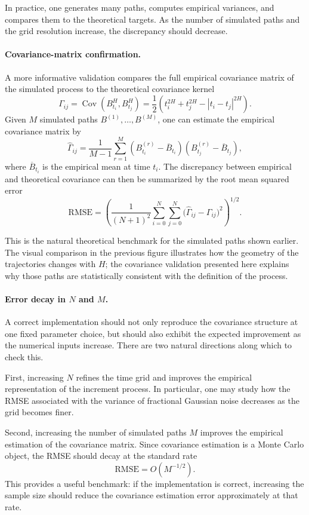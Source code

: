 \documentclass[a4paper,10pt,titlepage,oneside,openany]{book}
\theoremstyle{plain}
\theoremstyle{definition}
\theoremstyle{remark}
\newcommand{\Cov}{\operatorname{Cov}}
\newcommand{\1}{\mathbf{1}}
\begin{document}
In practice, one generates many paths, computes empirical variances, and compares them to the theoretical targets. As the number of simulated paths and the grid resolution increase, the discrepancy should decrease.

\paragraph{Covariance-matrix confirmation.} A more informative validation compares the full empirical covariance matrix of the simulated process to the theoretical covariance kernel
\[
\Gamma_{ij}
=
\Cov(B_{t_i}^H,B_{t_j}^H)
=
\frac12\left(
t_i^{2H}+t_j^{2H}-|t_i-t_j|^{2H}
\right).
\]
Given \(M\) simulated paths \(B^{(1)},\dots,B^{(M)}\), one can estimate the empirical covariance matrix by
\[
\widehat{\Gamma}_{ij}
=
\frac{1}{M-1}
\sum_{r=1}^{M}
\left(B_{t_i}^{(r)}-\overline{B}_{t_i}\right)
\left(B_{t_j}^{(r)}-\overline{B}_{t_j}\right),
\]
where \(\overline{B}_{t_i}\) is the empirical mean at time \(t_i\). The discrepancy between empirical and theoretical covariance can then be summarized by the root mean squared error
\[
\mathrm{RMSE}
=
\left(
\frac{1}{(N+1)^2}
\sum_{i=0}^{N}\sum_{j=0}^{N}
\bigl(\widehat{\Gamma}_{ij}-\Gamma_{ij}\bigr)^2
\right)^{1/2}.
\]

This is the natural theoretical benchmark for the simulated paths shown earlier. The visual comparison in the previous figure illustrates how the geometry of the trajectories changes with \(H\); the covariance validation presented here explains why those paths are statistically consistent with the definition of the process.

\paragraph{Error decay in \(N\) and \(M\).} A correct implementation should not only reproduce the covariance structure at one fixed parameter choice, but should also exhibit the expected improvement as the numerical inputs increase. There are two natural directions along which to check this.

First, increasing \(N\) refines the time grid and improves the empirical representation of the increment process. In particular, one may study how the RMSE associated with the variance of fractional Gaussian noise decreases as the grid becomes finer.

Second, increasing the number of simulated paths \(M\) improves the empirical estimation of the covariance matrix. Since covariance estimation is a Monte Carlo object, the RMSE should decay at the standard rate
\[
\mathrm{RMSE}=O(M^{-1/2}).
\]
This provides a useful benchmark: if the implementation is correct, increasing the sample size should reduce the covariance estimation error approximately at that rate.
\end{document}
